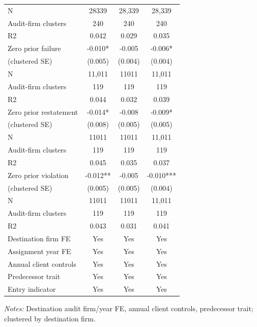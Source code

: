 \documentclass[10pt]{article}
\begin{document}
\begin{minipage}{19cm}
\begin{threeparttable}
\begin{tabular}{p{}ccc}
N & 28339 & 28,339 & 28,339 \\
Audit-firm clusters & 240 & 240 & 240 \\
R2 & 0.042 & 0.029 & 0.035 \\
Zero prior failure & -0.010* & -0.005 & -0.006* \\
(clustered SE) & (0.005) & (0.004) & (0.004) \\
N & 11,011 & 11011 & 11,011 \\
Audit-firm clusters & 119 & 119 & 119 \\
R2 & 0.044 & 0.032 & 0.039 \\
Zero prior restatement & -0.014* & -0.008 & -0.009* \\
(clustered SE) & (0.008) & (0.005) & (0.005) \\
N & 11011 & 11011 & 11,011 \\
Audit-firm clusters & 119 & 119 & 119 \\
R2 & 0.045 & 0.035 & 0.037 \\
Zero prior violation & -0.012** & -0.005 & -0.010*** \\
(clustered SE) & (0.005) & (0.005) & (0.004) \\
N & 11011 & 11011 & 11,011 \\
Audit-firm clusters & 119 & 119 & 119 \\
R2 & 0.043 & 0.031 & 0.041 \\
Destination firm FE & Yes & Yes & Yes \\
Assignment year FE & Yes & Yes & Yes \\
Annual client controls & Yes & Yes & Yes \\
Predecessor trait & Yes & Yes & Yes \\
Entry indicator & Yes & Yes & Yes \\
\bottomrule
\end{tabular}
\begin{tablenotes}\fontsize{9}{11}\selectfont
\item \raggedright \fontsize{9}{11}\selectfont \textit{Notes:} Destination audit firm/year FE, annual client controls, predecessor trait; clustered by destination firm.
\end{tablenotes}
\end{threeparttable}

\end{minipage}
\end{document}
